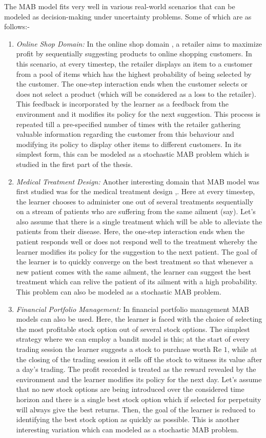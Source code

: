 
The MAB model fits very well in various real-world scenarios that can be modeled as decision-making under uncertainty  problems. Some of which are as follows:-
\begin{enumerate}
\item \emph{Online Shop Domain:} In the online shop domain \citep{ghavamzadeh2015bayesian}, a retailer aims to maximize profit by sequentially suggesting products to online shopping customers. In this scenario, at every timestep, the retailer displays an item to a customer from a pool of items which has the highest probability of being selected by the customer. The one-step interaction ends when the customer selects or does not select a product (which will be considered as a loss to the retailer). This feedback is incorporated by the learner as a feedback from the environment and it modifies its policy for the next suggestion. This process is repeated till a pre-specified number of times with the retailer gathering valuable information regarding the customer from this behaviour and modifying its policy to display other items to different customers. In its simplest form,  this can be modeled as a stochastic MAB problem which is studied in the first part of the thesis.
\item \emph{Medical Treatment Design:} Another interesting domain that MAB model was first studied was for the medical treatment design \citep{thompson1933likelihood},\citep{thompson1935theory}. Here at every timestep, the learner chooses to administer one out of several treatments sequentially on a stream of patients who are suffering from the same ailment (say). Let's also assume that there is a single treatment which will be able to alleviate the patients from their disease. Here, the  one-step interaction ends when the patient responds well or does not respond well to the treatment whereby the learner modifies its policy for the suggestion to the next patient. The goal of the learner is to quickly converge on the best treatment so that whenever a new patient comes with the same ailment, the learner can suggest the best treatment which can relive the patient of its ailment with a high probability. This problem can also be modeled as a stochastic MAB problem.
\item \emph{Financial Portfolio Management:} In financial portfolio management MAB models can also be used. Here, the learner is faced with the choice of selecting the most profitable stock option out of several stock options. The simplest strategy where we can employ a bandit model is this; at the start of every trading session the learner suggests a stock to purchase worth Re $1$, while at the closing of the trading session it sells off the stock to witness its value after a day's trading. The  profit recorded is treated as the reward revealed by the environment and the learner modifies its policy for the next day. Let's assume that no new stock options are being introduced over the considered time horizon and there is a single best stock option which if selected for perpetuity will always give the best returns. Then, the goal of the learner is reduced to identifying the best stock option as quickly as possible. This is another interesting variation which can modeled as a stochastic MAB problem.

\end{enumerate}
